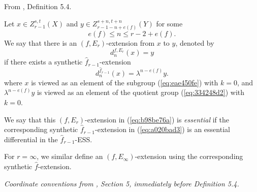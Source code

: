 \begin{definition}
\label{paper:5.4}
From \cite{LWX126}, Definition 5.4.\par
\label{def:6c076a33}
    Let $x\in Z^{s,t}_{r-1}(X)$ and $y\in Z^{s+n,t+n}_{r-1-n+e(f)}(Y)$ for some 
    $$e(f)\le n\le r-2+e(f).$$
    We say that there is an $(f,E_r)$-extension from $x$ to $y$, denoted by
    \begin{equation}\label{eq:b98be76a}
    d_{n}^{f,E_r}(x)=y
    \end{equation}
    if there exists a synthetic $\hat f_{r-1}$-extension
    \begin{equation}\label{eq:a020bad3}
        d_{n}^{\hat f_{r-1}}(x)=\lambda^{n-e(f)} y.
    \end{equation}
    where $x$ is viewed as an element of the subgroup (\ref{eq:eae450fe}) with $k=0$, and $\lambda^{n-e(f)} y$ is viewed as an element of the quotient group (\ref{eq:334248d2}) with $k=0$. 

   We say that this $(f,E_r)$-extension in (\ref{eq:b98be76a}) is \emph{essential} if the corresponding synthetic $\hat f_{r-1}$-extension in (\ref{eq:a020bad3}) is an essential differential in the $\hat f_{r-1}$-ESS.
    
    For $r=\infty$, we similar define an $(f,E_\infty)$-extension using the corresponding synthetic $\hat f$-extension.

\textit{Coordinate conventions from \cite{LWX126}, Section 5, immediately before Definition 5.4.}


\end{definition}
